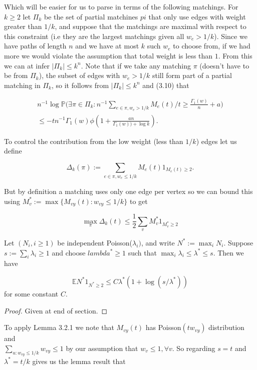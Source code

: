 Which will be easier for us to parse in terms of the following matchings.  For $k\geq 2$ let $\Pi_k$ be the set of partial matchines $pi$ that only use edges with weight greater than $1/k$, and suppose that the matchings are maximal with respect to this constraint (i.e they are the largest matchings given all $w_e > 1/k$).  Since we have paths of length $n$ and we have at most $k$ such $w_e$ to choose from, if we had more we would violate the assumption that total weight is less than $1$. From this we can at infer $|\Pi_k| \leq k^n$.  Note that if we take any matching $\pi$ (doesn't have to be from $\Pi_k$), the subset of edges with $w_e > 1/k$ still form part of a partial matching in $\Pi_k$, so it follows from $|\Pi_k| \leq k^n$ and (3.10) that 

\begin{multline}
n^{-1}\log \mathbb{P}\bigg( \exists \pi \in \Pi_k: n^{-1} \sum_{e \in \pi, w_e > 1/k}M_e(t)/t \geq \frac{\Gamma_1(w)}{n}+a\bigg)\\ \leq -tn^{-1}\Gamma_1(w)\phi(1+\frac{an}{\Gamma_1(w))+\log k}).
\end{multline}

To control the contribution from the low weight (less than $1/k$) edges let us define

$$ \Delta_k(\pi):= \sum_{e \in \pi, w_e \leq 1/k}M_e(t)1_{M_e(t) \geq 2}.$$

But by definition a matching uses only one edge per vertex so we can bound this using $M^*_v := \max\{M_{vy}(t):w_{vy} \leq 1/k\}$ to get

\begin{equation}
\max_{\pi}\Delta_k(t) \leq \frac{1}{2}\sum_vM_v^*1_{M_v^* \geq 2} 
\end{equation}

\begin{lemma}
Let $(N_i, i\geq 1)$ be independent Poisson($\lambda_i)$, and write $N^* := \max_i N_i$. Suppose $s:=\sum_i\lambda_i \geq 1$ and choose $lambda^* \geq 1$ such that $\max_i\lambda_i \leq \lambda^* \leq s$.  Then we have

$$\mathbb{E}N^*1_{N^*\geq 2} \leq C \lambda^* (1+\log(s/\lambda^*)) $$ for some constant $C$.  
\end{lemma}

\begin{proof}
Given at end of section.
\end{proof}

To apply Lemma 3.2.1 we note that  $M_{vy}(t)$ has Poisson$(tw_{vy})$ distribution and \\
$\sum_{u:w_{vy} \leq 1/k} w_{vy} \leq 1$ by our assumption that 
$w_v \leq 1, \forall v$.  So regarding $s=t$ and $\lambda^* = t/k$ gives us the lemma result that 

